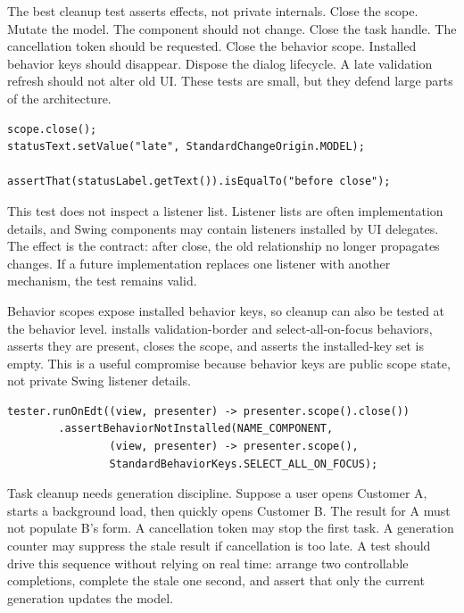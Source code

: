 The best cleanup test asserts effects, not private internals. Close the scope. Mutate the model. The component should not change. Close the task handle. The cancellation token should be requested. Close the behavior scope. Installed behavior keys should disappear. Dispose the dialog lifecycle. A late validation refresh should not alter old UI. These tests are small, but they defend large parts of the architecture.

\begin{lstlisting}[caption={Testing cleanup by effect.}]
scope.close();
statusText.setValue("late", StandardChangeOrigin.MODEL);

assertThat(statusLabel.getText()).isEqualTo("before close");
\end{lstlisting}

This test does not inspect a listener list. Listener lists are often implementation details, and Swing components may contain listeners installed by UI delegates. The effect is the contract: after close, the old relationship no longer propagates changes. If a future implementation replaces one listener with another mechanism, the test remains valid.

Behavior scopes expose installed behavior keys, so cleanup can also be tested at the behavior level.  installs validation-border and select-all-on-focus behaviors, asserts they are present, closes the scope, and asserts the installed-key set is empty. This is a useful compromise because behavior keys are public scope state, not private Swing listener details.

\begin{lstlisting}[caption={Asserting behavior cleanup through installed keys.}]
tester.runOnEdt((view, presenter) -> presenter.scope().close())
        .assertBehaviorNotInstalled(NAME_COMPONENT,
                (view, presenter) -> presenter.scope(),
                StandardBehaviorKeys.SELECT_ALL_ON_FOCUS);
\end{lstlisting}

Task cleanup needs generation discipline. Suppose a user opens Customer A, starts a background load, then quickly opens Customer B. The result for A must not populate B's form. A cancellation token may stop the first task. A generation counter may suppress the stale result if cancellation is too late. A test should drive this sequence without relying on real time: arrange two controllable completions, complete the stale one second, and assert that only the current generation updates the model.

